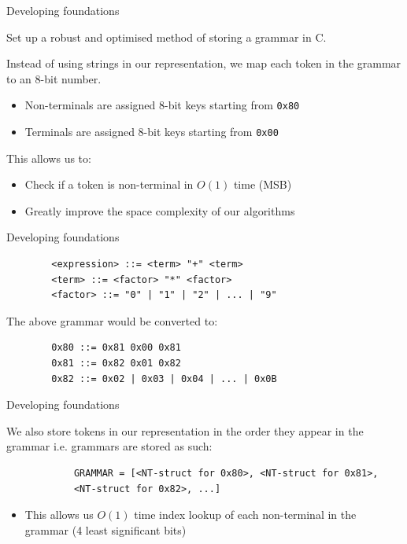 \documentclass{beamer}
\begin{document}
	\begin{frame}{Developing foundations}
			
		\begin{block}{}
			Set up a robust and optimised method of storing a grammar in C.
		\end{block}
		\vspace{10pt}

		Instead of using strings in our representation, we map each token in the grammar to an 8-bit number.
		\begin{itemize}
			\item Non-terminals are assigned 8-bit keys starting from \texttt{0x80}
			\item Terminals are assigned 8-bit keys starting from \texttt{0x00}
		\end{itemize}
		\vspace{10pt}
		This allows us to:
		\begin{itemize}
			\item Check if a token is non-terminal in $O(1)$ time (MSB)
			\item Greatly improve the space complexity of our algorithms
		\end{itemize}		

	\end{frame}

\begin{frame}[fragile]{Developing foundations}
				
	\begin{verbatim}
		<expression> ::= <term> "+" <term>
		<term> ::= <factor> "*" <factor>
		<factor> ::= "0" | "1" | "2" | ... | "9"
	\end{verbatim}
	The above grammar would be converted to:
	\begin{verbatim}
		0x80 ::= 0x81 0x00 0x81
		0x81 ::= 0x82 0x01 0x82 
		0x82 ::= 0x02 | 0x03 | 0x04 | ... | 0x0B 
	\end{verbatim}

\end{frame}

	\begin{frame}[fragile]{Developing foundations}
				
		We also store tokens in our representation in the order they appear in the grammar i.e. grammars are stored as such:
		\begin{verbatim}
			GRAMMAR = [<NT-struct for 0x80>, <NT-struct for 0x81>,
			<NT-struct for 0x82>, ...]
		\end{verbatim}

		\begin{itemize}
			\item This allows us $O(1)$ time index lookup of each non-terminal in the grammar (4 least significant bits)
		\end{itemize}

	\end{frame}
\end{document}
